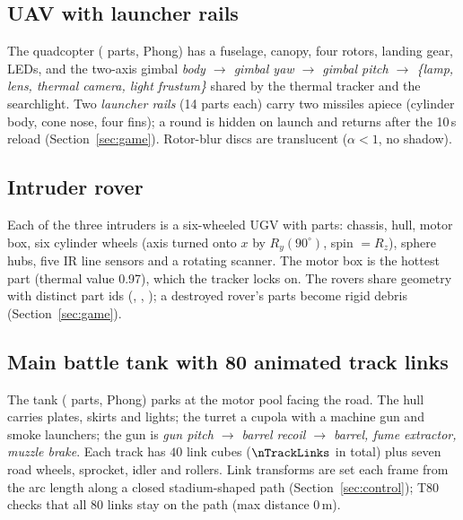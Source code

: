 \subsection{UAV with launcher rails}
The quadcopter (\partsUav{} parts, Phong) has a fuselage, canopy, four rotors, landing gear, LEDs, and the two-axis gimbal
\emph{body $\to$ gimbal yaw $\to$ gimbal pitch $\to$ \{lamp, lens, thermal camera, light frustum\}} shared by the thermal
tracker and the searchlight. Two \emph{launcher rails} (14 parts each) carry two missiles apiece (cylinder body, cone nose, four fins); a round is hidden on launch and
returns after the 10\,s reload (Section~\ref{sec:game}). Rotor-blur discs are translucent ($\alpha<1$, no shadow).

\subsection{Intruder rover}
Each of the three intruders is a six-wheeled UGV with \partsRover{} parts: chassis, hull, motor box, six
cylinder wheels (axis turned onto $x$ by $R_y(90^\circ)$, spin $=R_z$), sphere hubs, five IR line sensors and a rotating
scanner. The motor box is the hottest part (thermal value 0.97), which the tracker locks on. The rovers share geometry with distinct part ids (, , ); a destroyed rover's parts become rigid debris (Section~\ref{sec:game}).

\begin{figure}[h]
\centering
{}
\caption{}
\end{figure}
\subsection{Main battle tank with 80 animated track links}
The tank (\partsTank{} parts, Phong) parks at the motor pool facing the road. The hull carries plates, skirts and lights; the turret a cupola with a machine gun and smoke launchers; the gun is
\emph{gun pitch $\to$ barrel recoil $\to$ barrel, fume extractor, muzzle brake}. Each track has
$40$ link cubes ($\nTrackLinks$ in total) plus seven road wheels, sprocket, idler and rollers. Link
transforms are set each frame from the arc length along a closed stadium-shaped
path (Section~\ref{sec:control}); T80 checks that all 80 links stay on the path (max distance $0$\,m).

